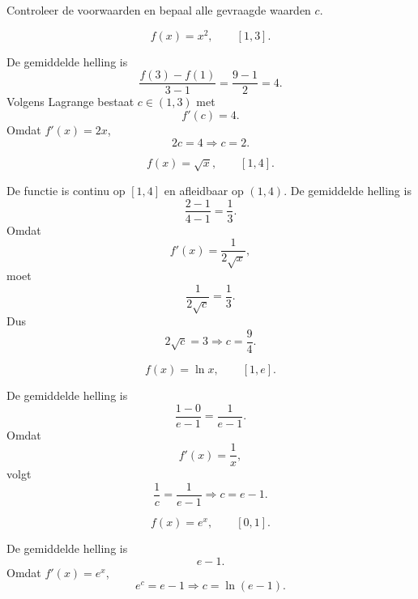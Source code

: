 \documentclass{ximera}
\begin{document}
\begin{oefening}{\oefB\ESS}
Controleer de voorwaarden en bepaal alle gevraagde waarden \(c\).

\begin{question}
\[
f(x)=x^2,\qquad [1,3].
\]
\begin{oplossing}
De gemiddelde helling is
\[
\frac{f(3)-f(1)}{3-1}=\frac{9-1}{2}=4.
\]
Volgens Lagrange bestaat \(c\in(1,3)\) met
\[
f'(c)=4.
\]
Omdat \(f'(x)=2x\),
\[
2c=4\Longrightarrow\boxed{c=2}.
\]
\end{oplossing}
\end{question}

\begin{question}
\[
f(x)=\sqrt{x},\qquad [1,4].
\]
\begin{oplossing}
De functie is continu op \([1,4]\) en afleidbaar op \((1,4)\).
De gemiddelde helling is
\[
\frac{2-1}{4-1}=\frac13.
\]
Omdat
\[
f'(x)=\frac1{2\sqrt{x}},
\]
moet
\[
\frac1{2\sqrt{c}}=\frac13.
\]
Dus
\[
2\sqrt c=3
\Longrightarrow
\boxed{c=\frac94}.
\]
\end{oplossing}
\end{question}

\begin{question}
\[
f(x)=\ln x,\qquad [1,e].
\]
\begin{oplossing}
De gemiddelde helling is
\[
\frac{1-0}{e-1}=\frac1{e-1}.
\]
Omdat
\[
f'(x)=\frac1x,
\]
volgt
\[
\frac1c=\frac1{e-1}
\Longrightarrow
\boxed{c=e-1}.
\]
\end{oplossing}
\end{question}

\begin{question}
\[
f(x)=e^x,\qquad [0,1].
\]
\begin{oplossing}
De gemiddelde helling is
\[
e-1.
\]
Omdat \(f'(x)=e^x\),
\[
e^c=e-1
\Longrightarrow
\boxed{c=\ln(e-1)}.
\]
\end{oplossing}
\end{question}
\end{oefening}


\end{document}
